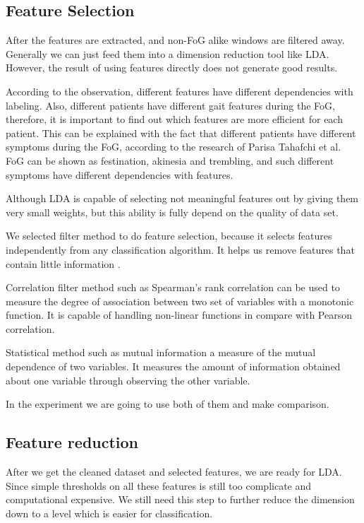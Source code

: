 \documentclass[article]{article}
\begin{document}
\subsection{Feature Selection}

After the features are extracted, and non-FoG alike windows are filtered away. Generally we can just feed them into a dimension reduction tool like LDA. However, the result of using features directly does not generate good results.

According to the observation, different features have different dependencies with labeling. Also, different patients have different gait features during the FoG, therefore, it is important to find out which features are more efficient for each patient. This can be explained with the fact that different patients have different symptoms during the FoG, according to the research of Parisa Tahafchi et al.\cite{symptoms} FoG can be shown as festination, akinesia and trembling, and such different symptoms have different dependencies with features. 

Although LDA is capable of selecting not meaningful features out by giving them very small weights, but this ability is fully depend on the quality of data set.

We selected filter method to do feature selection, because it selects features independently from any classification algorithm. It helps us remove features that contain little information .

Correlation filter method such as Spearman's rank correlation can be used to measure the degree of association between two set of variables with a monotonic function. It is capable of handling non-linear functions in compare with Pearson correlation.

Statistical method such as mutual information a measure of the mutual dependence of two variables. It measures the amount of information obtained about one variable through observing the other variable. 

In the experiment we are going to use both of them and make comparison.


\subsection{Feature reduction}

After we get the cleaned dataset and selected features, we are ready for LDA. Since simple thresholds on all these features is still too complicate and computational expensive. We still need this step to further reduce the dimension down to a level which is easier for classification.
\end{document}
